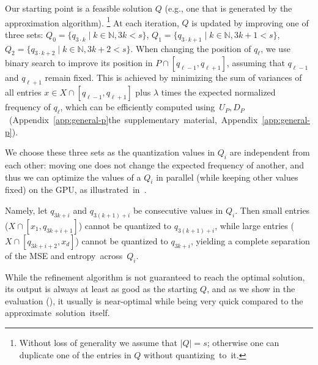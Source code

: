 \documentclass[11pt,letterpaper]{article}
\newcommand{\ran}[1]{\textcolor{red}{Ran:~#1}}
\newcommand{\ran}[1]{}
\newcommand{\appendixlocation}[1]{\ifarxiv Appendix~\ref{#1}\else the supplementary material, Appendix~\ref{#1}\fi}
\begin{document}
{Our starting point is a feasible solution $Q$ (e.g., one that is generated by the approximation algorithm). \footnote{Without loss of generality we assume that $|Q|=s$; otherwise one can duplicate one of the entries in $Q$ without \mbox{quantizing to it.}}
At each iteration, $Q$ is updated by improving one of three sets: $Q_{0}=\{q_{3\cdot k}\mid k\in\mathbb N, 3k<s\}$, $Q_{1}=\{q_{3\cdot k + 1}\mid k\in\mathbb N, 3k + 1<s\}$, $Q_{2}=\{q_{3\cdot k + 2}\mid k\in\mathbb N, 3k + 2<s\}$. 
When changing the position of $q_\ell$, we use binary search to improve its position in $P\cap [q_{\ell-1},q_{\ell+1}]$, assuming that $q_{\ell-1}$ and $q_{\ell+1}$ remain fixed.
This is achieved by minimizing the sum of variances of all entries $x\in X\cap [q_{\ell-1},q_{\ell+1}]$ plus $\lambda$ times the expected normalized frequency of $q_\ell$, which can be efficiently computed \mbox{using $U_P,D_P$ (\appendixlocation{app:general-p}).}



We choose these three sets as the quantization values in $Q_i$ are independent from each other: moving one does not change the expected frequency of another, and thus we can optimize the values of a $Q_i$ in parallel (while keeping other values fixed) on the GPU, as \mbox{illustrated in~.}

Namely, let $q_{3k+i}$ and $q_{3(k+1)+i}$ be consecutive values in $Q_i$. Then small entries ($X\cap[x_1,q_{3k+i+1}]$) cannot be quantized to $q_{3(k+1)+i}$, while large entries ($X\cap[q_{3k+i+2},x_d]$) cannot be quantized to $q_{3k+i}$, yielding a complete separation of the MSE and \mbox{entropy across $Q_i$.}

While the refinement algorithm is not guaranteed to reach the optimal solution, its output is always at least as good as the starting $Q$, and as we show in the evaluation (), it usually is near-optimal while being very quick compared to the \mbox{approximate solution itself.}






}
\end{document}
